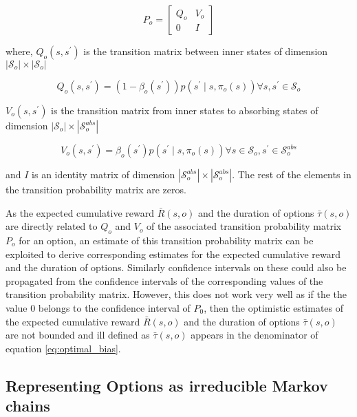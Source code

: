 \begin{equation}
    P_o = \begin{bmatrix}
       Q_o & V_o \\
       0 & I
    \end{bmatrix}
\end{equation}

where, $Q_o(s, s^\prime)$ is the transition matrix between inner states of dimension $|\mathcal{S}_o| \times |\mathcal{S}_o|$

\begin{equation}
    Q_o(s, s^\prime) = (1 - \beta_o(s^\prime)) p(s^\prime \mid s, \pi_o(s)) \forall s, s^\prime \in \mathcal{S}_o
\end{equation}

$V_o(s, s^\prime)$ is the transition matrix from inner states to absorbing states of dimension $|\mathcal{S}_o| \times |\mathcal{S}_o^{abs}|$

\begin{equation}
    V_o(s, s^\prime) = \beta_o(s^\prime) p(s^\prime \mid s, \pi_o(s)) \forall s \in \mathcal{S}_o, s^\prime \in \mathcal{S}_o^{abs}
\end{equation}

and $I$ is an identity matrix of dimension $|\mathcal{S}_o^{abs}| \times |\mathcal{S}_o^{abs}|$.
The rest of the elements in the transition probability matrix are zeros.

As the expected cumulative reward $\bar{R}(s, o)$ and the duration of options $\bar{\tau}(s, o)$ are directly related to $Q_o$ and $V_o$ of the associated transition probability matrix $P_o$ for an option, an estimate of this transition probability matrix can be exploited to derive corresponding estimates for the expected cumulative reward and the duration of options.
Similarly confidence intervals on these could also be propagated from the confidence intervals of the corresponding values of the transition probability matrix.
However, this does not work very well as if the the value 0 belongs to the confidence interval of $P_0$, then the optimistic estimates of the expected cumulative reward $\bar{R}(s, o)$ and the duration of options $\bar{\tau}(s, o)$ are not bounded and ill defined as $\bar{\tau}(s, o)$ appears in the denominator of equation \ref{eq:optimal_bias}.


\subsection{Representing Options as irreducible Markov chains}

